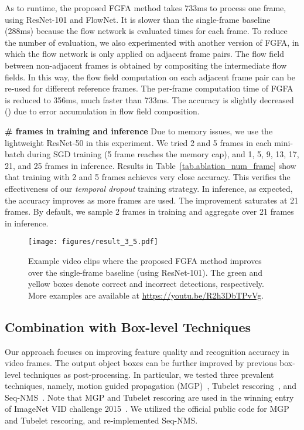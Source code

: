 \documentclass[10pt,twocolumn,letterpaper]{article}
\begin{document}
As to runtime, the proposed FGFA method takes 733ms to process one frame, using ResNet-101 and FlowNet. It is slower than the single-frame baseline (288ms) because the flow network is evaluated  times for each frame. To reduce the number of evaluation, we also experimented with another version of FGFA, in which the flow network is only applied on adjacent frame pairs. The flow field between non-adjacent frames is obtained by compositing the intermediate flow fields. In this way, the flow field computation on each adjacent frame pair can be re-used for different reference frames. The per-frame computation time of FGFA is reduced to 356ms, much faster than 733ms. The accuracy is slightly decreased () due to error accumulation in flow field composition.

\textbf{\# frames in training and inference} Due to memory issues, we use the lightweight ResNet-50 in this experiment. We tried 2 and 5 frames in each mini-batch during SGD training (5 frame reaches the memory cap), and 1, 5, 9, 13, 17, 21, and 25 frames in inference. Results in Table~\ref{tab.ablation_num_frame} show that training with 2 and 5 frames achieves very close accuracy. This verifies the effectiveness of our \emph{temporal dropout} training strategy. In inference, as expected, the accuracy improves as more frames are used. The improvement saturates at 21 frames. By default, we sample 2 frames in training and aggregate over 21 frames in inference.

\begin{figure*}[t]
\begin{center}
\texttt{[image: figures/result\_3\_5.pdf]}
\end{center}
\caption{Example video clips where the proposed FGFA method improves over the single-frame baseline (using ResNet-101). The green and yellow boxes denote correct and incorrect detections, respectively. More examples are available at \url{https://youtu.be/R2h3DbTPvVg}.}
\label{fig.detection_results}
\end{figure*}

\subsection{Combination with Box-level Techniques}

Our approach focuses on improving feature quality and recognition accuracy in video frames. The output object boxes can be further improved by previous box-level techniques as post-processing. In particular, we tested three prevalent techniques, namely, motion guided propagation (MGP)~\cite{kang2016tcnn}, Tubelet rescoring~\cite{kang2016tcnn}, and Seq-NMS~\cite{han2016seqnms}. Note that MGP and Tubelet rescoring are used in the winning entry of ImageNet VID challenge 2015~\cite{kang2016tcnn}. We utilized the official public code for MGP and Tubelet rescoring, and re-implemented Seq-NMS.
\end{document}
